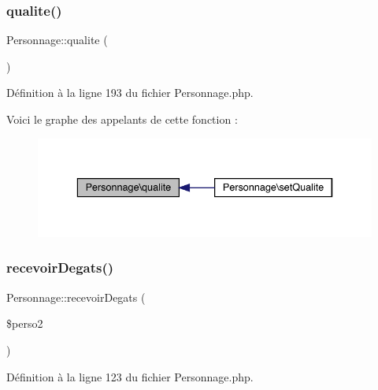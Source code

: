 \subsubsection{\texorpdfstring{qualite()}{qualite()}}
{\footnotesize\ttfamily Personnage\+::qualite (\begin{DoxyParamCaption}{ }\end{DoxyParamCaption})}



Définition à la ligne 193 du fichier Personnage.\+php.

Voici le graphe des appelants de cette fonction \+:\nopagebreak
\begin{figure}[H]
\begin{center}
\leavevmode
\includegraphics[width=336pt]{class_personnage_ae8daf1e07c298cf03a98b6b06d3adfd9_icgraph}
\end{center}
\end{figure}
\mbox{\label{class_personnage_a226affce78dca0151e0901896e58f14d}} 
\subsubsection{\texorpdfstring{recevoir\+Degats()}{recevoirDegats()}}
{\footnotesize\ttfamily Personnage\+::recevoir\+Degats (\begin{DoxyParamCaption}\item[{}]{\$perso2 }\end{DoxyParamCaption})}



Définition à la ligne 123 du fichier Personnage.\+php.

